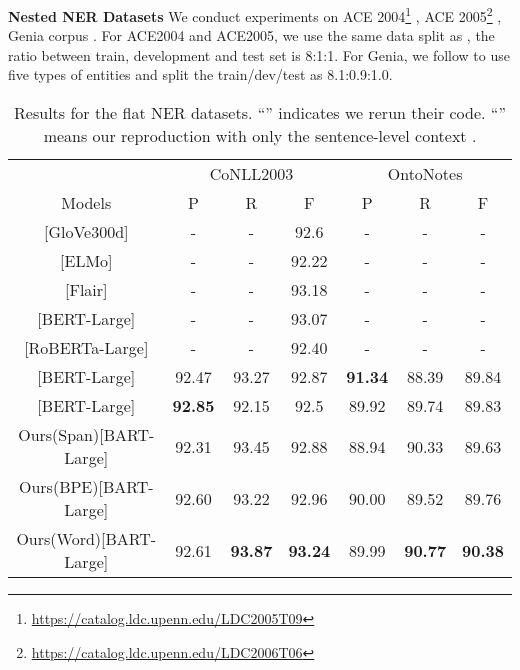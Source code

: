 \documentclass[11pt,a4paper]{article}
\begin{document}
\textbf{Nested NER Datasets} We conduct experiments on ACE 2004\footnote{\url{https://catalog.ldc.upenn.edu/LDC2005T09}} \citep{DBLP:conf/lrec/DoddingtonMPRSW04}, ACE 2005\footnote{\url{https://catalog.ldc.upenn.edu/LDC2006T06}} \citep{walker2005ace}, Genia corpus \citep{DBLP:conf/ismb/KimOTT03}. For ACE2004 and ACE2005, we use the same data split as \citet{DBLP:conf/emnlp/LuR15,DBLP:conf/emnlp/MuisL17,DBLP:conf/acl/YuBP20}, the ratio between train, development and test set is 8:1:1. For Genia, we follow \citet{DBLP:conf/emnlp/WangLTZ20,DBLP:journals/tacl/ShibuyaH20} to use five types of entities and split the train/dev/test as 8.1:0.9:1.0.

\begin{table*}[ht]
  \centering
  \setlength{\tabcolsep}{2pt}
  \begin{tabular}{c|ccc|ccc}
\toprule
     & \multicolumn{3}{c|}{CoNLL2003} & \multicolumn{3}{c}{OntoNotes} \\
  Models  & P        & R        & F       & P        & R        & F       \\
\midrule
  \citet{DBLP:conf/emnlp/ClarkLML18}[GloVe300d]                      & -        & -        & 92.6    &    -     &      -   &     -    \\
  \citet{DBLP:conf/naacl/PetersNIGCLZ18}[ELMo] & - & - & 92.22 & - & - & - \\
  \citet{DBLP:conf/naacl/AkbikBV19}[Flair] & -  & - & 93.18 & - & - & - \\
  \citet{DBLP:conf/acl/StrakovaSH19}[BERT-Large] & -        & -        & 93.07   &      -   &       -  &    -     \\
  \citet{DBLP:conf/emnlp/YamadaASTM20}[RoBERTa-Large] & -        & -        & 92.40   &      -   &       -  &    -     \\
  \citet{DBLP:conf/acl/LiFMHWL20}[BERT-Large] &  92.47 & 93.27 & 92.87 &  \textbf{91.34} & 88.39 & 89.84 \\
  \citet{DBLP:conf/acl/YuBP20}[BERT-Large]            & \textbf{92.85}    & 92.15    & 92.5    & 89.92    & 89.74    & 89.83   \\
  \midrule
  Ours(Span)[BART-Large]    & 92.31    & 93.45    & 92.88   & 88.94    & 90.33    & 89.63   \\
  Ours(BPE)[BART-Large]  & 92.60    & 93.22    & 92.96   & 90.00    & 89.52    & 89.76   \\
  Ours(Word)[BART-Large]    & 92.61    & \textbf{93.87}    & \textbf{93.24}   & 89.99    & \textbf{90.77}    & \textbf{90.38}   \\
  \bottomrule
  \end{tabular}
  \caption{Results for the flat NER datasets. ``'' indicates we rerun their code. ``'' means our reproduction with only the sentence-level context \protect\footnotemark. }
  \label{tb:flat_ner}
\end{table*}
\end{document}
